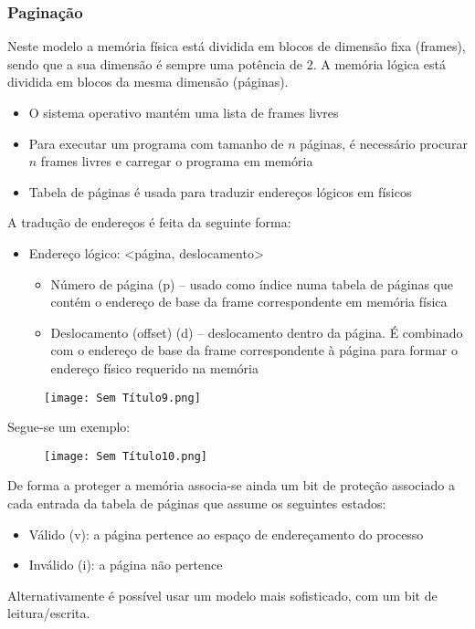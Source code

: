 \documentclass[10pt,a4paper]{report}
\begin{document}
\subsubsection{Paginação}
Neste modelo a memória física está dividida em blocos de dimensão fixa (frames), sendo que a sua dimensão é sempre uma potência de 2. A memória lógica está dividida em blocos da mesma dimensão (páginas).
\begin{itemize}
\item O sistema operativo mantém uma lista de frames livres
\item Para executar um programa com tamanho de $n$ páginas, é necessário procurar $n$ frames livres e carregar o programa em memória
\item Tabela de páginas é usada para traduzir endereços
lógicos em físicos
\end{itemize}
A tradução de endereços é feita da seguinte forma:
\begin{itemize}
\item Endereço lógico: <página, deslocamento>
\begin{itemize}
\item Número de página (p) – usado como índice numa tabela de páginas que contém o endereço de base da frame correspondente em memória física
\item Deslocamento (offset) (d) – deslocamento dentro da página. É combinado com o endereço de base da frame correspondente à página para formar o endereço físico requerido na memória
\end{itemize}
\end{itemize}
\begin{figure}[H]
\centering
\texttt{[image: Sem Título9.png]}
\end{figure}
Segue-se um exemplo:
\begin{figure}[H]
\centering
\texttt{[image: Sem Título10.png]}
\end{figure}
De forma a proteger a memória associa-se ainda um bit de proteção associado a cada entrada da tabela de páginas que assume os seguintes estados:
\begin{itemize}
\item Válido (v): a página pertence ao espaço de endereçamento do processo
\item Inválido (i): a página não pertence
\end{itemize}
Alternativamente é possível usar um modelo mais sofisticado, com um bit de leitura/escrita.
\end{document}
